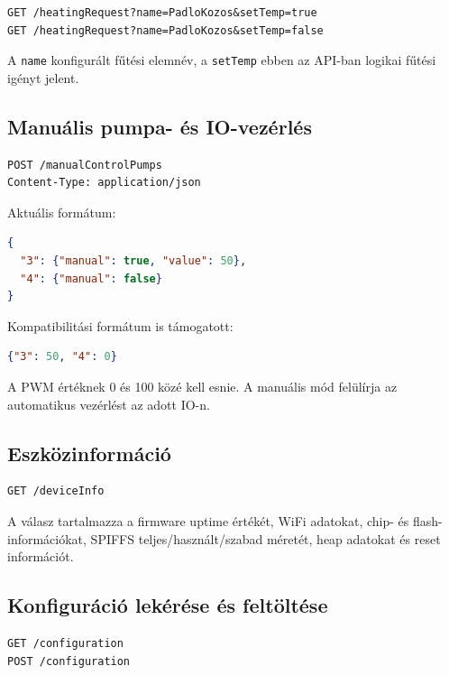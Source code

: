 \documentclass[11pt,a4paper]{article}
\begin{document}
\begin{lstlisting}
GET /heatingRequest?name=PadloKozos&setTemp=true
GET /heatingRequest?name=PadloKozos&setTemp=false
\end{lstlisting}

A \texttt{name} konfigurált fűtési elemnév, a \texttt{setTemp} ebben az API-ban logikai fűtési igényt jelent.

\subsection{Manuális pumpa- és IO-vezérlés}

\begin{lstlisting}
POST /manualControlPumps
Content-Type: application/json
\end{lstlisting}

Aktuális formátum:

\begin{lstlisting}[language=json]
{
  "3": {"manual": true, "value": 50},
  "4": {"manual": false}
}
\end{lstlisting}

Kompatibilitási formátum is támogatott:

\begin{lstlisting}[language=json]
{"3": 50, "4": 0}
\end{lstlisting}

A PWM értéknek 0 és 100 közé kell esnie. A manuális mód felülírja az automatikus vezérlést az adott IO-n.

\subsection{Eszközinformáció}

\begin{lstlisting}
GET /deviceInfo
\end{lstlisting}

A válasz tartalmazza a firmware uptime értékét, WiFi adatokat, chip- és flash-információkat, SPIFFS teljes/használt/szabad méretét, heap adatokat és reset információt.

\subsection{Konfiguráció lekérése és feltöltése}

\begin{lstlisting}
GET /configuration
POST /configuration
\end{lstlisting}
\end{document}

